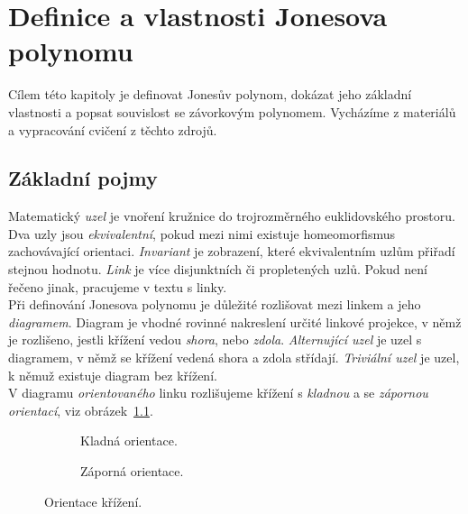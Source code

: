 
\chapter{Definice a vlastnosti Jonesova polynomu}
Cílem této kapitoly je definovat Jonesův polynom, dokázat jeho základní vlastnosti a popsat souvislost se závorkovým polynomem. Vycházíme z materiálů~\cite{cromwell2004knots, Adams2004, jones2005, weiping2016lecture} a vypracování cvičení z těchto zdrojů.
\section{Základní pojmy}
Matematický \emph{uzel} je vnoření kružnice do trojrozměrného euklidovského prostoru. Dva uzly jsou \emph{ekvivalentní}, pokud mezi nimi existuje homeomorfismus zachovávající orientaci. \emph{Invariant} je zobrazení, které ekvivalentním uzlům přiřadí stejnou hodnotu.
\emph{Link} je více disjunktních či propletených uzlů. Pokud není řečeno jinak, pracujeme v textu s linky. 
\\
Při definování Jonesova polynomu je důležité rozlišovat mezi linkem a jeho \emph{diagramem}. Diagram je vhodné rovinné nakreslení určité linkové projekce, v němž je rozlišeno, jestli křížení vedou \emph{shora}, nebo \emph{zdola}. \emph{Alternující uzel} je uzel s diagramem, v němž se křížení vedená shora a zdola střídají. \emph{Triviální uzel} je uzel, k němuž existuje diagram bez křížení.
\\
V diagramu \emph{orientovaného} linku rozlišujeme křížení s \emph{kladnou} a se \emph{zápornou orientací}, viz obrázek~\ref{orientace}.

\begin{figure}[h]    

\centering 
\begin{subfigure}[t]{0.4\linewidth}\centering
{} 
\caption{Kladná orientace.} 
\end{subfigure}
\begin{subfigure}[t]{0.4\linewidth}\centering
{}  
\caption{Záporná orientace.}
\end{subfigure}

\caption{Orientace křížení.}
\label{orientace}
\end{figure}  


